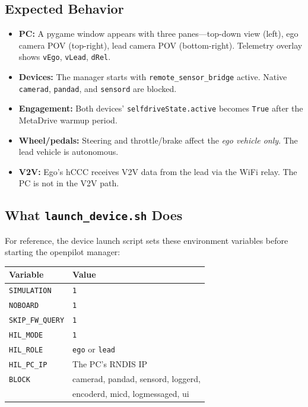 \documentclass[11pt, letterpaper]{article}
\begin{document}
\subsection{Expected Behavior}

\begin{itemize}
  \item \textbf{PC:} A pygame window appears with three panes---top-down
        view (left), ego camera POV (top-right), lead camera POV
        (bottom-right).  Telemetry overlay shows \texttt{vEgo},
        \texttt{vLead}, \texttt{dRel}.
  \item \textbf{Devices:} The manager starts with
        \texttt{remote\_sensor\_bridge} active.  Native
        \texttt{camerad}, \texttt{pandad}, and \texttt{sensord} are
        blocked.
  \item \textbf{Engagement:} Both devices' \texttt{selfdriveState.active}
        becomes \texttt{True} after the MetaDrive warmup period.
  \item \textbf{Wheel/pedals:} Steering and throttle/brake affect the
        \emph{ego vehicle only}.  The lead vehicle is autonomous.
  \item \textbf{V2V:} Ego's hCCC receives V2V data from the lead via
        the WiFi relay.  The PC is not in the V2V path.
\end{itemize}

\subsection{What \texttt{launch\_device.sh} Does}

For reference, the device launch script sets these environment variables
before starting the openpilot manager:

\begin{center}
\begin{tabular}{@{}ll@{}}
\toprule
\textbf{Variable} & \textbf{Value} \\
\midrule
\texttt{SIMULATION}         & \texttt{1} \\
\texttt{NOBOARD}            & \texttt{1} \\
\texttt{SKIP\_FW\_QUERY}    & \texttt{1} \\
\texttt{HIL\_MODE}          & \texttt{1} \\
\texttt{HIL\_ROLE}          & \texttt{ego} or \texttt{lead} \\
\texttt{HIL\_PC\_IP}        & The PC's RNDIS IP \\
\texttt{BLOCK}              & camerad, pandad, sensord, loggerd, \\
                            & encoderd, micd, logmessaged, ui \\
\bottomrule
\end{tabular}
\end{center}
\end{document}
